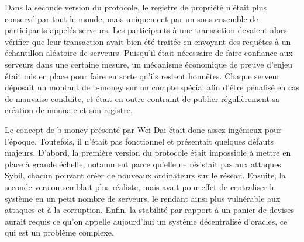 Dans la seconde version du protocole, le registre de propriété n'était plus conservé par tout le monde, mais uniquement par un sous-ensemble de participants appelés serveurs. Les participants à une transaction devaient alors vérifier que leur transaction avait bien été traitée en envoyant des requêtes à un échantillon aléatoire de serveurs. Puisqu'il était nécessaire de faire confiance aux serveurs dans une certaine mesure, un mécanisme économique de preuve d'enjeu était mis en place pour faire en sorte qu'ils restent honnêtes. Chaque serveur déposait un montant de b-money sur un compte spécial afin d'être pénalisé en cas de mauvaise conduite, et était en outre contraint de publier régulièrement sa création de monnaie et son registre.

Le concept de b-money présenté par Wei Dai était donc assez ingénieux pour l'époque. Toutefois, il n'était pas fonctionnel et présentait quelques défauts majeurs. D'abord, la première version du protocole était impossible à mettre en place à grande échelle, notamment parce qu'elle ne résistait pas aux attaques Sybil, chacun pouvant créer de nouveaux ordinateurs sur le réseau. Ensuite, la seconde version semblait plus réaliste, mais avait pour effet de centraliser le système en un petit nombre de serveurs, le rendant ainsi plus vulnérable aux attaques et à la corruption. Enfin, la stabilité par rapport à un panier de devises aurait requis ce qu'on appelle aujourd'hui un système décentralisé d'oracles, ce qui est un problème complexe. %

